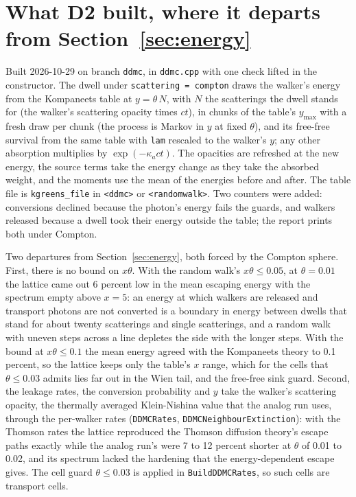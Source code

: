 \documentclass[11pt]{article}
\newcommand{\key}[1]{\texttt{#1}}
\begin{document}
\section{What D2 built, where it departs from Section~\ref{sec:energy}}
\label{sec:d2}

Built 2026-10-29 on branch \texttt{ddmc}, in \texttt{ddmc.cpp} with one check lifted in
the constructor.  The dwell under \key{scattering = compton} draws the walker's energy
from the Kompaneets table at $y = \theta\,N$, with $N$ the scatterings the dwell stands
for (the walker's scattering opacity times $ct$), in chunks of the table's $y_{\max}$
with a fresh draw per chunk (the process is Markov in $y$ at fixed $\theta$), and its
free-free survival from the same table with \texttt{lam} rescaled to the walker's $y$;
any other absorption multiplies by $\exp(-\kappa_a ct)$.  The opacities are refreshed at
the new energy, the source terms take the energy change as they take the absorbed
weight, and the moments use the mean of the energies before and after.  The table file
is \key{kgreens\_file} in \texttt{<ddmc>} or \texttt{<randomwalk>}.  Two counters were
added: conversions declined because the photon's energy fails the guards, and walkers
released because a dwell took their energy outside the table; the report prints both
under Compton.

Two departures from Section~\ref{sec:energy}, both forced by the Compton sphere.
First, there is no bound on $x\theta$.  With the random walk's $x\theta\le0.05$, at
$\theta = 0.01$ the lattice came out 6 percent low in the mean escaping energy with the
spectrum empty above $x = 5$: an energy at which walkers are released and transport
photons are not converted is a boundary in energy between dwells that stand for about
twenty scatterings and single scatterings, and a random walk with uneven steps across a
line depletes the side with the longer steps.  With the bound at $x\theta\le0.1$ the
mean energy agreed with the Kompaneets theory to 0.1 percent, so the lattice keeps only
the table's $x$ range, which for the cells that $\theta\le0.03$ admits lies far out in
the Wien tail, and the free-free sink guard.  Second, the leakage rates, the conversion
probability and $y$ take the walker's scattering opacity, the thermally averaged
Klein-Nishina value that the analog run uses, through the per-walker rates
(\texttt{DDMCRates}, \texttt{DDMCNeighbourExtinction}): with the Thomson rates the
lattice reproduced the Thomson diffusion theory's escape paths exactly while the analog
run's were 7 to 12 percent shorter at $\theta$ of 0.01 to 0.02, and its spectrum lacked
the hardening that the energy-dependent escape gives.  The cell guard $\theta\le0.03$ is
applied in \texttt{BuildDDMCRates}, so such cells are transport cells.
\end{document}

